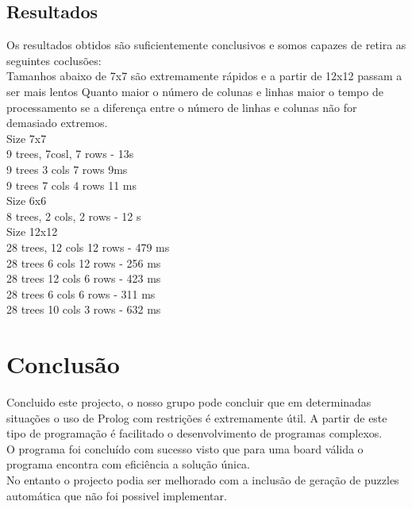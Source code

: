 \documentclass[runningheads,a4paper]{llncs}
\begin{document}
\subsection{Resultados}

Os resultados obtidos são suficientemente conclusivos e somos capazes de retira as seguintes coclusões:\\

Tamanhos abaixo de 7x7 são extremamente rápidos e a partir de 12x12 passam a ser mais lentos
Quanto maior o número de colunas e linhas maior o tempo de processamento se a diferença entre o número de linhas e colunas não for demasiado extremos.\\


Size 7x7\\
9 trees, 7cosl, 7 rows - 13s\\
9 trees 3 cols 7 rows  9ms\\
9 trees 7 cols 4 rows 11 ms\\

Size 6x6\\
8 trees, 2 cols, 2 rows - 12 s\\

Size 12x12 \\
28 trees, 12 cols 12 rows - 479 ms\\
28 trees 6 cols 12 rows - 256 ms\\
28 trees 12 cols 6 rows - 423 ms\\
28 trees 6 cols 6 rows - 311 ms\\
28 trees 10 cols 3 rows - 632 ms\\


\section{Conclusão}


Concluido este projecto, o nosso grupo pode concluir que em determinadas situações o uso de Prolog com restrições é extremamente útil. A partir de este tipo de programação é facilitado o desenvolvimento de programas complexos.\\
	O programa foi concluído com sucesso visto que para uma board válida o programa encontra com eficiência a solução única. \\
	No entanto o projecto podia ser melhorado com a inclusão de geração de puzzles automática que não foi possivel implementar.\\
\end{document}
